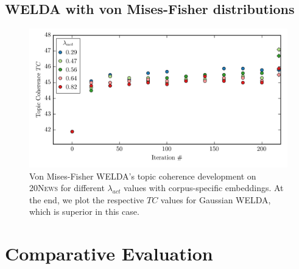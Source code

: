 \documentclass[
        a4paper,
        titlepage,
        twoside,
        parskip,
        numbers=noenddot
        ]{scrbook}
\theoremstyle{break}
\begin{document}
\begin{appendices}
  \subsection{WELDA with von Mises-Fisher distributions}
  \label{sec:appendix_welda_vmf}
  \begin{figure}[H]
         \centering
         \includegraphics[width=\textwidth]{figures/welda_vmf_20news.png}
         \caption{Von Mises-Fisher WELDA's topic coherence development on \textsc{20News} for different $\lambda_{act}$ values with corpus-specific embeddings. At the end, we plot the respective $TC$ values for Gaussian WELDA, which is superior in this case.}
         \label{fig:welda_vmf_20news}
  \end{figure}

  \section{Comparative Evaluation}

\end{appendices}
\end{document}
